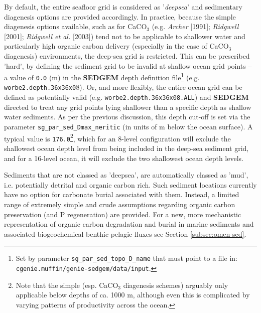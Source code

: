 By default, the entire seafloor grid is considered as '\textit{deepsea}' and sedimentary diagenesis options are provided accordingly. In practice, because the simple diagenesis options available, such as for CaCO\(_{3}\) (e.g. \textit{Archer} [1991]; \textit{Ridgwell} [2001]; \textit{Ridgwell et al.} [2003]) tend not to be applicable to shallower water and particularly high organic carbon delivery (especially in the case of CaCO\(_{3}\) diagenesis) environments, the deep-sea grid is restricted. This can be prescribed 'hard', by defining the sediment grid to be invalid at shallow  ocean grid points -- a value of \texttt{0.0} (m) in the \textbf{SEDGEM} depth definition file\footnote{Set by parameter \texttt{sg\_par\_sed\_topo\_D\_name} that must point to a file in: \\\texttt{cgenie.muffin/genie-sedgem/data/input}.} (e.g. \texttt{worbe2.depth.36x36x0}8).
 Or, and more flexibly, the entire ocean grid can be defined as potentially valid (e.g. \texttt{worbe2.depth.36x36x08.ALL}) and \textbf{SEDGEM} directed to treat any grid points lying shallower than a specific depth as shallow water sediments. As per the previous discussion, this depth cut-off is set via the parameter \texttt{sg\_par\_sed\_Dmax\_neritic} (in units of m below the ocean surface). A typical value is \texttt{176.0}\footnote{Note that the simple (esp. CaCO\(_{3}\) diagenesis schemes) arguably only applicable below depths of ca. 1000 m, although even this is complicated by varying patterns of productivity across the ocean.}, which for an 8-level configuration will exclude the shallowest ocean depth level from being included in the deep-sea sediment grid, and for a 16-level ocean, it will exclude the two shallowest ocean depth levels.

\vspace{1mm}
Sediments that are not classed as 'deepsea', are automatically classed as 'mud', i.e. potentially detrital and organic carbon rich. Such sediment locations  currently have no option for carbonate burial associated with them. Instead, a limited range of extremely simple and crude assumptions regarding organic carbon preservation (and P regeneration) are provided.
For a new, more mechanistic representation of organic carbon degradation and burial in marine sediments and associated biogeochemical benthic-pelagic fluxes see Section \ref{subsec:omen-sed}.

